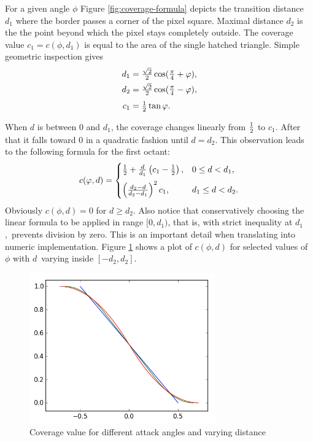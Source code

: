 For a given angle $\phi$ Figure \ref{fig:coverage-formula} depicts the transition distance $d_1$ where the border passes a corner of the pixel square. Maximal distance $d_2$ is the the point beyond which the pixel stays completely outside. The coverage value $c_1 = c(\phi, d_1)$ is equal to the area of the single hatched triangle. Simple geometric inspection gives
\begin{equation}\begin{split}
	d_1 &= \tfrac{\sqrt{2}}{2}\cos(\tfrac{\pi}{4} + \varphi), \\
    d_2 &= \tfrac{\sqrt{2}}{2}\cos(\tfrac{\pi}{4} - \varphi), \\[3pt]
    c_1 &= \tfrac{1}{2} \tan\varphi.
\end{split}\end{equation}

When $d$ is between 0 and $d_1$, the coverage changes linearly from $\tfrac{1}{2}$ to $c_1$. After that it falls toward 0 in a quadratic fashion until $d = d_2$. This observation leads to the following formula for the first octant:
\begin{equation}\label{eq:octant-coverge-formula}
	c(\varphi, d) = \begin{cases}
    	\tfrac{1}{2} + \frac{d}{d_1} \left( c_1 - \tfrac{1}{2} \right),
        	& 0 \leq d < d_1, \\[6pt]
        \left(\frac{d_2 - d}{d_2 - d_1}\right)^2 c_1,
        	& d_1 \leq d < d_2.
	\end{cases}
\end{equation}
Obviously $c(\phi, d) = 0$ for $d \geq d_2$. Also notice that conservatively choosing the linear formula to be applied in range $[0, d_1)$, that is, with strict inequality at $d_1$,~prevents division by zero. This is an important detail when translating into numeric implementation. Figure \ref{fig:coverage-plot} shows a plot of $c(\phi, d)$ for selected values of $\phi$ with $d$~varying inside $[-d_2, d_2]$.

\begin{figure}\label{fig:coverage-plot}
	\includegraphics[width=8cm]{img/coverage-plot.png}
    \caption{Coverage value for different attack angles and varying distance}
\end{figure}